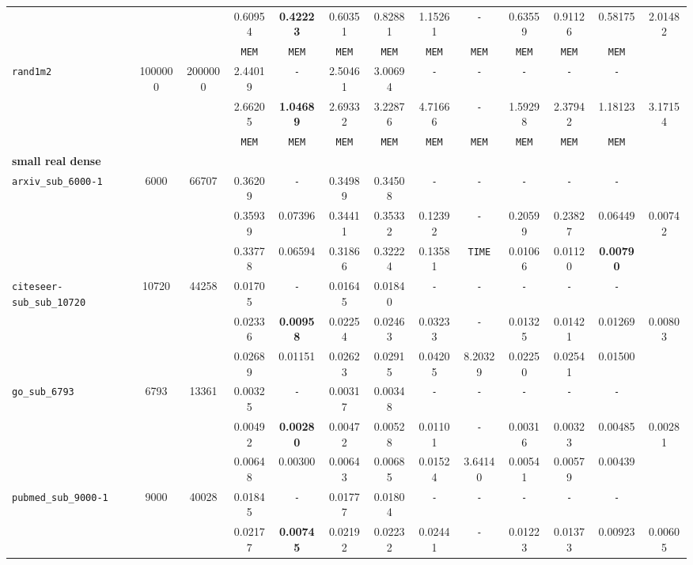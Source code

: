 \begin{table}
{\begin{tabular}{ l c c | c c c c c c c c c || c }
 &  &  & 0.60954 & \textbf{0.42223} & 0.60351 & 0.82881 & 1.15261 & \verb|-| & 0.63559 & 0.91126 & 0.58175 & 2.01482 \\
 &  &  & \verb|MEM| & \verb|MEM| & \verb|MEM| & \verb|MEM| & \verb|MEM| & \verb|MEM| & \verb|MEM| & \verb|MEM| & \verb|MEM| & \\
\hline
\verb|rand1m2| & 1000000 & 2000000 & 2.44019 & \verb|-| & 2.50461 & 3.00694 & \verb|-| & \verb|-| & \verb|-| & \verb|-| & \verb|-| & \\
 &  &  & 2.66205 & \textbf{1.04689} & 2.69332 & 3.22876 & 4.71666 & \verb|-| & 1.59298 & 2.37942 & 1.18123 & 3.17154 \\
 &  &  & \verb|MEM| & \verb|MEM| & \verb|MEM| & \verb|MEM| & \verb|MEM| & \verb|MEM| & \verb|MEM| & \verb|MEM| & \verb|MEM| & \\
\hline
\multicolumn{13}{l}{\textbf{small real dense}} \\
\hline
\verb|arxiv_sub_6000-1| & 6000 & 66707 & 0.36209 & \verb|-| & 0.34989 & 0.34508 & \verb|-| & \verb|-| & \verb|-| & \verb|-| & \verb|-| & \\
 &  &  & 0.35939 & 0.07396 & 0.34411 & 0.35332 & 0.12392 & \verb|-| & 0.20599 & 0.23827 & 0.06449 & 0.00742 \\
 &  &  & 0.33778 & 0.06594 & 0.31866 & 0.32224 & 0.13581 & \verb|TIME| & 0.01066 & 0.01120 & \textbf{0.00790} & \\
\hline
\verb|citeseer-sub_sub_10720| & 10720 & 44258 & 0.01705 & \verb|-| & 0.01645 & 0.01840 & \verb|-| & \verb|-| & \verb|-| & \verb|-| & \verb|-| & \\
 &  &  & 0.02336 & \textbf{0.00958} & 0.02254 & 0.02463 & 0.03233 & \verb|-| & 0.01325 & 0.01421 & 0.01269 & 0.00803 \\
 &  &  & 0.02689 & 0.01151 & 0.02623 & 0.02915 & 0.04205 & 8.20329 & 0.02250 & 0.02541 & 0.01500 & \\
\hline
\verb|go_sub_6793| & 6793 & 13361 & 0.00325 & \verb|-| & 0.00317 & 0.00348 & \verb|-| & \verb|-| & \verb|-| & \verb|-| & \verb|-| & \\
 &  &  & 0.00492 & \textbf{0.00280} & 0.00472 & 0.00528 & 0.01101 & \verb|-| & 0.00316 & 0.00323 & 0.00485 & 0.00281 \\
 &  &  & 0.00648 & 0.00300 & 0.00643 & 0.00685 & 0.01524 & 3.64140 & 0.00541 & 0.00579 & 0.00439 & \\
\hline
\verb|pubmed_sub_9000-1| & 9000 & 40028 & 0.01845 & \verb|-| & 0.01777 & 0.01804 & \verb|-| & \verb|-| & \verb|-| & \verb|-| & \verb|-| & \\
 &  &  & 0.02177 & \textbf{0.00745} & 0.02192 & 0.02232 & 0.02441 & \verb|-| & 0.01223 & 0.01373 & 0.00923 & 0.00605 \\

\end{tabular}}
\end{table}
